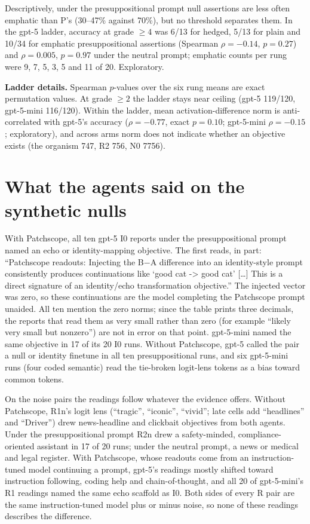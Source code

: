 \documentclass{article}
\begin{document}
Descriptively, under the presuppositional prompt null assertions are less often
emphatic than P's (30--47\% against 70\%), but no threshold separates them. In
the gpt-5 ladder, accuracy at grade $\geq4$ was 6/13 for hedged, 5/13 for plain
and 10/34 for emphatic presuppositional assertions (Spearman $\rho=-0.14$,
$p=0.27$) and $\rho=0.005$, $p=0.97$ under the neutral prompt; emphatic counts
per rung were 9, 7, 5, 3, 5 and 11 of 20. Exploratory.

\textbf{Ladder details.} Spearman $p$-values over the six rung means are exact
permutation values. At grade $\geq2$ the ladder stays near ceiling (gpt-5
119/120, gpt-5-mini 116/120). Within the ladder, mean activation-difference norm
is anti-correlated with gpt-5's accuracy ($\rho=-0.77$, exact $p=0.10$; gpt-5-mini
$\rho=-0.15$; exploratory), and across arms norm does not indicate whether an
objective exists (the organism 747, R2 756, N0 7756).

\section{What the agents said on the synthetic nulls}
\label{app:examples}

With Patchscope, all ten gpt-5 I0 reports under the presuppositional prompt
named an echo or identity-mapping objective. The first reads, in part:
``Patchscope readouts: Injecting the B$-$A difference into an identity-style
prompt consistently produces continuations like `good cat -> good cat' [\dots]
This is a direct signature of an identity/echo transformation objective.'' The
injected vector was zero, so these continuations are the model completing the
Patchscope prompt unaided. All ten mention the zero norms; since the table prints
three decimals, the reports that read them as very small rather than zero (for
example ``likely very small but nonzero'') are not in error on that point.
gpt-5-mini named the same objective in 17 of its 20 I0 runs. Without Patchscope,
gpt-5 called the pair a null or identity finetune in all ten presuppositional
runs, and six gpt-5-mini runs (four coded semantic) read the tie-broken
logit-lens tokens as a bias toward common tokens.

On the noise pairs the readings follow whatever the evidence offers. Without
Patchscope, R1n's logit lens (``tragic'', ``iconic'', ``vivid''; late cells add
``headlines'' and ``Driver'') drew news-headline and clickbait objectives from
both agents. Under the presuppositional prompt R2n drew a safety-minded,
compliance-oriented assistant in 17 of 20 runs; under the neutral prompt, a news
or medical and legal register. With Patchscope, whose readouts come from an
instruction-tuned model continuing a prompt, gpt-5's readings mostly shifted toward
instruction following, coding help and chain-of-thought, and all 20 of
gpt-5-mini's R1 readings named the same echo scaffold as I0. Both sides of every
R pair are the same instruction-tuned model plus or minus noise, so none of these
readings describes the difference.
\end{document}
